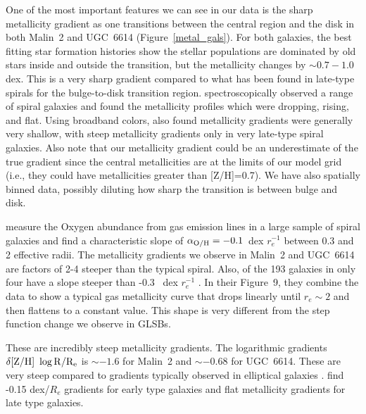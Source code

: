 \documentclass[12pt,preprint]{aastex}
\begin{document}
One of the most important features we can see in our data is the sharp metallicity gradient as one transitions between the central region and the disk in both Malin~2 and UGC~6614 (Figure~\ref{metal_gals}).
For both galaxies, the best fitting star formation histories show the stellar populations are dominated by old stars inside and outside the transition, but the metallicity changes by $\sim0.7-1.0$ dex.
This is a very sharp gradient compared to what has been found in late-type spirals for the bulge-to-disk transition region.
\citet{MacArthur09} spectroscopically observed a range of spiral galaxies and found the metallicity profiles which were dropping, rising, and flat.
Using broadband colors, \citet{MacArthur04} also found metallicity gradients were generally very shallow, with steep metallicity gradients only in very late-type spiral galaxies. Also note that our metallicity gradient could be an underestimate of the true gradient since the central metallicities are at the limits of our model grid (i.e., they could have metallicities greater than [Z/H]=0.7). We have also spatially binned data, possibly diluting how sharp the transition is between bulge and disk.

\citet{Sanchez14} measure the Oxygen abundance from gas emission lines in a large sample of spiral galaxies and find a characteristic slope of $\alpha_{\rm{O/H}} = -0.1$\ dex $r_e^{-1}$ between 0.3 and 2 effective radii.
The metallicity gradients we observe in Malin~2 and UGC~6614 are factors of 2-4 steeper than the typical spiral. Also, of the 193 galaxies in \citet{Sanchez14} only four have a slope steeper than -0.3 \ dex $r_e^{-1}$ \citep[Figure~6]{Sanchez14}.
In their Figure~9, they combine the data to show a typical gas metallicity curve that drops linearly until $r_e\sim2$ and then flattens to a constant value.
This shape is very different from the step function change we observe in GLSBs.


These are incredibly steep metallicity gradients.
The logarithmic gradients $\delta \rm{[Z/H]}\ \log{R/R_e}$ is $\sim -1.6$ for Malin~2 and $\sim -0.68$ for UGC~6614.
These are very steep compared to gradients typically observed in elliptical galaxies \citep{Kuntschner10, Greene12, Greene15}.
\citet{Wilkinson15} find -0.15 dex/$R_e$ gradients for early type galaxies and flat metallicity gradients for late type galaxies. 
\end{document}
